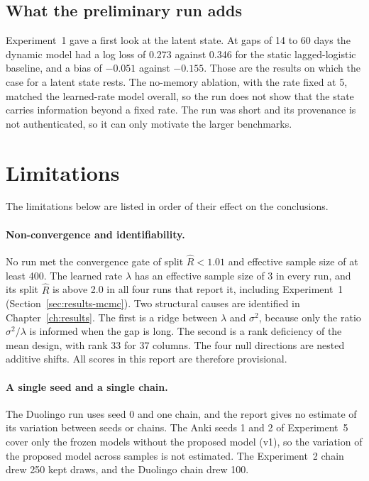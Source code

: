\subsection*{What the preliminary run adds}

Experiment~1 gave a first look at the latent state. At gaps of 14 to 60 days the dynamic model had a log loss of 0.273
against 0.346 for the static lagged-logistic baseline, and a bias of $-0.051$ against $-0.155$. Those are the
results on which the case for a latent state rests. The no-memory ablation, with the rate fixed at 5, matched the
learned-rate model overall, so the run does not show that the state carries information beyond a fixed rate. The
run was short and its provenance is not authenticated, so it can only motivate the larger benchmarks.

\section{Limitations}
\label{sec:concl-limitations}

The limitations below are listed in order of their effect on the conclusions.

\paragraph{Non-convergence and identifiability.}
No run met the convergence gate of split $\hat R < 1.01$ and effective sample size of at least 400. The learned rate
$\lambda$ has an effective sample size of 3 in every run, and its split $\hat R$ is above 2.0 in all four runs that report it, including Experiment~1
(Section~\ref{sec:results-mcmc}). Two structural causes are identified in Chapter~\ref{ch:results}. The first is a ridge
between $\lambda$ and $\sigma^2$, because only the ratio $\sigma^2/\lambda$ is informed when the gap is long. The second
is a rank deficiency of the mean design, with rank 33 for 37 columns. The four null directions are nested additive shifts.
All scores in this report are therefore provisional.

\paragraph{A single seed and a single chain.}
The Duolingo run uses seed 0 and one chain, and the report gives no estimate of its variation between seeds or chains. The Anki seeds 1 and 2 of Experiment~5 cover only the frozen models without the proposed model (v1), so the variation of the proposed model across samples is not estimated. The Experiment~2 chain drew 250 kept draws, and the Duolingo chain drew 100.

